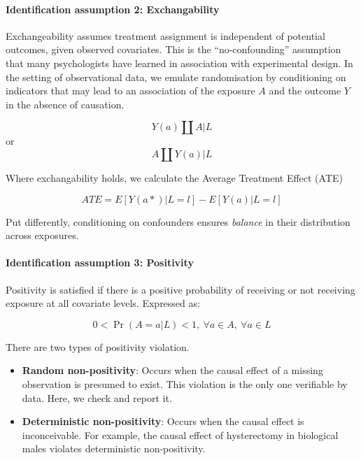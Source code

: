 \documentclass[
  singlecolumn]{article}
\let\oldparagraph\paragraph
\renewcommand{\paragraph}[1]{\oldparagraph{#1}\mbox{}}
\begin{document}
\paragraph{Identification assumption 2:
Exchangability}\label{identification-assumption-2-exchangability}

Exchangeability assumes treatment assignment is independent of potential
outcomes, given observed covariates. This is the ``no-confounding''
assumption that many psychologists have learned in association with
experimental design. In the setting of observational data, we emulate
randomisation by conditioning on indicators that may lead to an
association of the exposure \(A\) and the outcome \(Y\) in the absence
of causation.

\[Y(a)\coprod  A|L\] or \[A \coprod  Y(a)|L\]

Where exchangability holds, we calculate the Average Treatment Effect
(ATE)

\[
ATE = E[Y(a*)|L = l] - E[Y(a)|L = l] 
\]

Put differently, conditioning on confounders ensures \emph{balance} in
their distribution across exposures.

\paragraph{Identification assumption 3:
Positivity}\label{identification-assumption-3-positivity}

Positivity is satisfied if there is a positive probability of receiving
or not receiving exposure at all covariate levels. Expressed as:

\begin{equation}
0 < \Pr(A=a|L)<1, ~ \forall a \in A, ~ \forall a \in L
\end{equation}

There are two types of positivity violation.

\begin{itemize}
\item
  \textbf{Random non-positivity}: Occurs when the causal effect of a
  missing observation is presumed to exist. This violation is the only
  one verifiable by data. Here, we check and report it.
\item
  \textbf{Deterministic non-positivity}: Occurs when the causal effect
  is inconceivable. For example, the causal effect of hysterectomy in
  biological males violates deterministic non-positivity.
\end{itemize}
\end{document}
